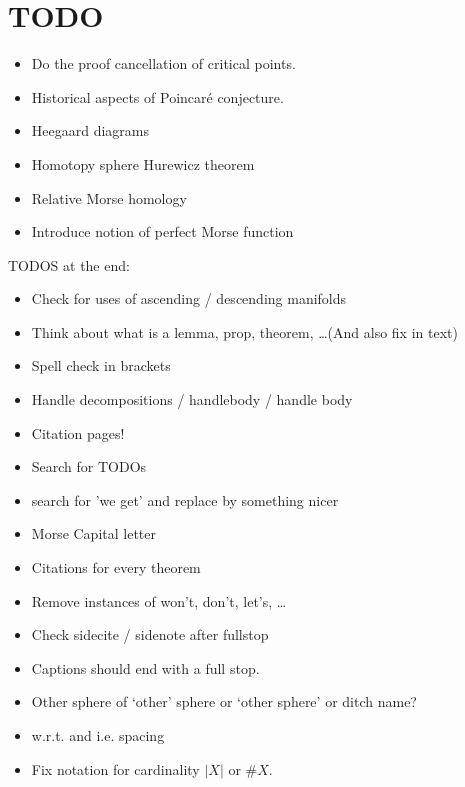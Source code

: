 \chapter*{TODO}
\begin{itemize}
    \item Do the proof cancellation of critical points.
    \item Historical aspects of Poincaré conjecture.
    \item Heegaard diagrams
    \item Homotopy sphere Hurewicz theorem
    \item Relative Morse homology
    \item Introduce notion of perfect Morse function
\end{itemize}


TODOS at the end:
\begin{itemize}
    \item Check for uses of ascending / descending manifolds
    \item Think about what is a lemma, prop, theorem, \ldots (And also fix in text)
    \item Spell check in brackets
    \item Handle decompositions / handlebody / handle body
    \item Citation pages!
    \item Search for TODOs
    \item search for 'we get' and replace by something nicer
    \item Morse Capital letter
    \item Citations for every theorem
    \item Remove instances of won't, don't, let's, \ldots
    \item Check sidecite / sidenote after fullstop
    \item Captions should end with a full stop.
    \item Other sphere of `other' sphere or `other sphere' or ditch name?
    \item w.r.t. and i.e. spacing
        \item Fix notation for cardinality $|X| $ or  $\# X$.
\end{itemize}
